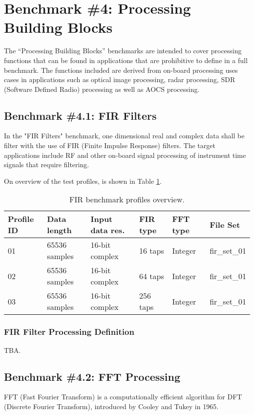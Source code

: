 \section{Benchmark \#4: Processing Building Blocks}
The “Processing Building Blocks” benchmarks are intended to cover processing functions that can be found in applications that are prohibitive to define in a full benchmark. The functions included are derived from on-board processing uses cases in applications such as optical image processing, radar processing, SDR (Software Defined Radio) processing as well as AOCS processing.

\subsection{Benchmark \#4.1: FIR Filters}
In the "FIR Filters" benchmark, one dimensional real and complex data shall be filter with the use of FIR (Finite Impulse Response) filters. The target applications include RF and other on-board signal processing of instrument time signals that require filtering.

On overview of the test profiles, is shown in Table \ref{tab:fir_profiles}.

\begin{table}[!h]
\centering
\begin{tabular}{|l|l|l|l|l|l|}
    \hline
    Profile ID  & Data length     & Input data res. & FIR type  & FFT type  & File Set      \\ \hline 
    \hline
    01	        & 65536 samples	  & 16-bit complex  & 16 taps   & Integer   & fir\_set\_01  \\ \hline
    02	        & 65536 samples	  & 16-bit complex  & 64 taps   & Integer   & fir\_set\_01  \\ \hline
    03	        & 65536 samples	  & 16-bit complex  & 256 taps  & Integer   & fir\_set\_01  \\ \hline
\end{tabular}
\caption{FIR benchmark profiles overview.}
\label{tab:fir_profiles}
\end{table}

\subsubsection{FIR Filter Processing Definition}
TBA.

\subsection{Benchmark \#4.2: FFT Processing}
\label{section:fft}
FFT (Fast Fourier Transform) is a computationally efficient algorithm for DFT (Discrete Fourier Transform), introduced by Cooley and Tukey in 1965.


